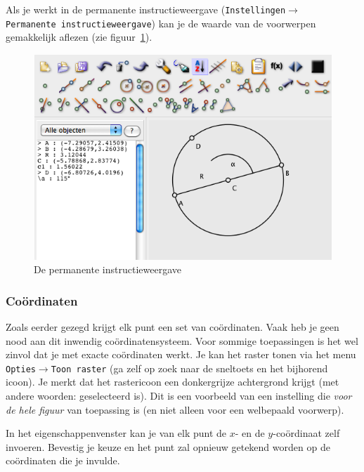  Als je werkt in de permanente instructieweergave (\texttt{Instellingen$\rightarrow$\\Permanente instructieweergave}) kan je de waarde van de voorwerpen gemakkelijk aflezen (zie figuur~\ref{fig:permanent}).
\begin{figure}[htb]
    \centering
    \includegraphics[width=\textwidth]{figuren/PeL/permanente_instructieweergave.png}
       \caption{De permanente instructieweergave}
    \label{fig:permanent}
\end{figure}



\subsubsection{Co\"{o}rdinaten}
Zoals eerder gezegd krijgt elk punt een set van co\"ordinaten. Vaak heb je geen nood aan dit inwendig co\"{o}rdinatensysteem. Voor sommige toepassingen is het wel zinvol dat je met exacte co\"{o}rdinaten werkt. Je kan het raster tonen via het menu \texttt{Opties$\rightarrow$Toon raster} (ga zelf op zoek naar de sneltoets en het bijhorend icoon). Je merkt dat het rastericoon een donkergrijze achtergrond krijgt (met andere woorden: geselecteerd is). Dit is een voorbeeld van een instelling die \emph{voor de hele figuur} van toepassing is (en niet alleen voor een welbepaald voorwerp). 

In het eigenschappenvenster kan je van elk punt de $x$- en de $y$-co\"{o}rdinaat zelf invoeren. Bevestig je keuze en het punt zal opnieuw getekend worden op de co\"{o}rdinaten die je invulde.

